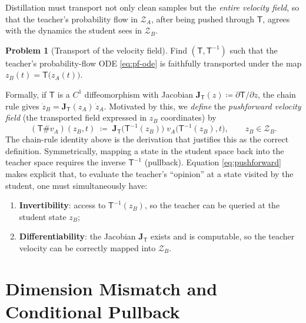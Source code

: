 \documentclass[11pt,a4paper]{article}
\newcommand{\Za}{\mathcal{Z}_{A}}
\newcommand{\Zb}{\mathcal{Z}_{B}}
\newcommand{\Tmap}{\mathsf{T}}
\newcommand{\Tinv}{\mathsf{T}^{-1}}
\newcommand{\push}{\#}
\newcommand{\Jac}{\mathbf{J}}
\theoremstyle{definition}
\newtheorem{problem}{Problem}
\begin{document}
Distillation must transport not only clean samples but the \emph{entire velocity field}, so that
the teacher's probability flow in $\Za$, after being pushed through $\Tmap$, agrees with the
dynamics the student sees in $\Zb$.

\begin{problem}[Transport of the velocity field]
\label{prob:pf-existence}
Find $(\Tmap,\Tinv)$ such that the teacher's probability-flow ODE \eqref{eq:pf-ode} is
faithfully transported under the map $z_B(t)=\Tmap\big(z_A(t)\big)$.
\end{problem}

Formally, if $\Tmap$ is a $C^1$ diffeomorphism with Jacobian
$\Jac_{\Tmap}(z)\coloneqq\partial\Tmap/\partial z$, the chain rule gives
$\dot z_B=\Jac_{\Tmap}(z_A)\,\dot z_A$. Motivated by this, we \emph{define} the
\emph{pushforward velocity field} (the transported field expressed in $z_B$ coordinates) by
\begin{equation}
(\Tmap\push v_A)(z_B,t)
\;\coloneqq\;
\Jac_{\Tmap}\!\big(\Tinv(z_B)\big)\;
v_A\!\big(\Tinv(z_B),t\big),
\qquad z_B\in\Zb.
\label{eq:pushforward}
\end{equation}
The chain-rule identity above is the derivation that justifies this as the correct definition.
Symmetrically, mapping a state in the student space back into the teacher space requires the
inverse $\Tinv$ (pullback). Equation \eqref{eq:pushforward} makes explicit that, to evaluate the
teacher's ``opinion'' at a state visited by the student, one must simultaneously have:
\begin{enumerate}[leftmargin=2em,itemsep=2pt]
  \item \textbf{Invertibility}: access to $\Tinv(z_B)$, so the teacher can be queried at the
        student state $z_B$;
  \item \textbf{Differentiability}: the Jacobian $\Jac_{\Tmap}$ exists and is computable, so the
        teacher velocity can be correctly mapped into $\Zb$.
\end{enumerate}

\section{Dimension Mismatch and Conditional Pullback}
\label{sec:cond-pullback}
\end{document}
